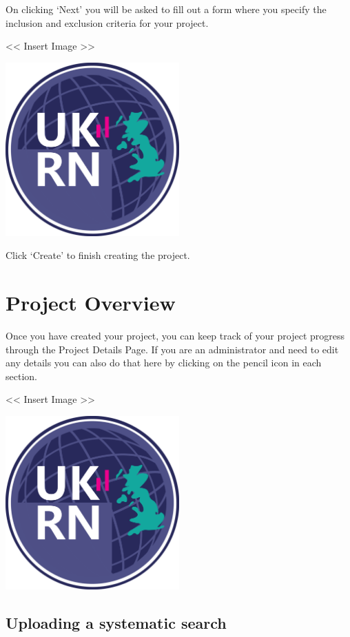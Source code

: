 \documentclass[
]{book}
\begin{document}
On clicking `Next' you will be asked to fill out a form where you specify the inclusion and exclusion criteria for your project.

\textless{}\textless{} Insert Image \textgreater{}\textgreater{}

\includegraphics[width=0.5\textwidth,height=0.5\textheight]{figs/evidence-triangle.png}

Click `Create' to finish creating the project.

\hypertarget{projectOverview}{%
\chapter{Project Overview}\label{projectOverview}}

Once you have created your project, you can keep track of your project progress through the Project Details Page. If you are an administrator and need to edit any details you can also do that here by clicking on the pencil icon in each section.

\textless{}\textless{} Insert Image \textgreater{}\textgreater{}

\includegraphics[width=0.5\textwidth,height=0.5\textheight]{figs/evidence-triangle.png}

\hypertarget{uploading-a-systematic-search}{%
\section{Uploading a systematic search}\label{uploading-a-systematic-search}}
\end{document}
